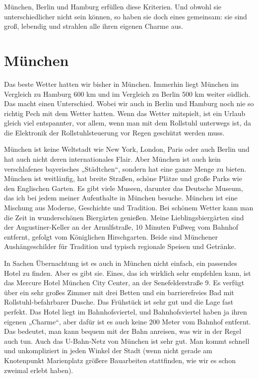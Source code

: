 \documentclass[fontsize=14pt,a4paper,headinclude,DIV=calc,automark]{scrbook}
\begin{document}
München, Berlin und Hamburg erfüllen diese Kriterien. Und obwohl sie unterschiedlicher nicht sein können, so haben sie doch eines gemeinsam: sie sind groß, lebendig und strahlen alle ihren eigenen Charme aus.

\section{München}

Das beste Wetter hatten wir bisher in München. Immerhin liegt München im Vergleich zu Hamburg 600 km und im Vergleich zu Berlin 500 km weiter südlich. Das macht einen Unterschied. Wobei wir auch in Berlin und Hamburg noch nie so richtig Pech mit dem Wetter hatten. Wenn das Wetter mitspielt, ist ein Urlaub gleich viel entspannter, vor allem, wenn man mit dem Rollstuhl unterwegs ist, da die Elektronik der Rollstuhlsteuerung vor Regen geschützt werden muss.

München ist keine Weltstadt wie New York, London, Paris oder auch Berlin und hat auch nicht deren internationales Flair. Aber München ist auch kein verschlafenes bayerisches „Städtchen“, sondern hat eine ganze Menge zu bieten. München ist weitläufig, hat breite Straßen, schöne Plätze und große Parks wie den Englischen Garten. Es gibt viele Museen, darunter das Deutsche Museum, das ich bei jedem meiner Aufenthalte in München besuche. München ist eine Mischung aus Moderne, Geschichte und Tradition. Bei schönem Wetter kann man die Zeit in wunderschönen Biergärten genießen. Meine Lieblingsbiergärten sind der Augustiner-Keller an der Arnulfstraße, 10 Minuten Fußweg vom Bahnhof entfernt, gefolgt vom Königlichen Hirschgarten. Beide sind Münchener Aushängeschilder für Tradition und typisch regionale Speisen und Getränke.

In Sachen Übernachtung ist es auch in München nicht einfach, ein passendes Hotel zu finden. Aber es gibt sie. Eines, das ich wirklich sehr empfehlen kann, ist das Mercure Hotel München City Center, an der Senefelderstraße 9. Es verfügt über ein sehr großes Zimmer mit drei Betten und ein barrierefreies Bad mit Rollstuhl-befahrbarer Dusche. Das Frühstück ist sehr gut und die Lage fast perfekt. Das Hotel liegt im Bahnhofsviertel, und Bahnhofsviertel haben ja ihren eigenen „Charme“, aber dafür ist es auch keine 200 Meter vom Bahnhof entfernt. Das bedeutet, man kann bequem mit der Bahn anreisen, was wir in der Regel auch tun. Auch das U-Bahn-Netz von München ist sehr gut. Man kommt schnell und unkompliziert in jeden Winkel der Stadt (wenn nicht gerade am Knotenpunkt Marienplatz größere Bauarbeiten stattfinden, wie wir es schon zweimal erlebt haben).
\end{document}
